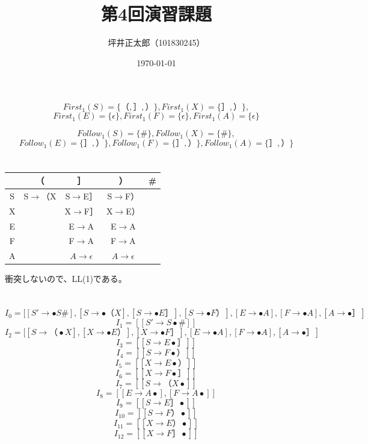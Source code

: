 \documentclass[a4paper,10pt]{jsarticle}
\begin{document}
\title{第4回演習課題}
\author{坪井正太郎（101830245）}
\date{\today}
\maketitle
\section{}
\[First_1(S)=\{（,］,）\},First_1(X)=\{］,）\},\]
\[First_1(E)=\{\epsilon\},First_1(F)=\{\epsilon\},First_1(A)=\{\epsilon\}\]

\[Follow_1(S)=\{\#\},Follow_1(X)=\{\#\},\]
\[Follow_1(E)=\{］,）\},Follow_1(F)=\{］,）\},Follow_1(A)=\{］,）\}\]

\section{}
\begin{table}[H]
  \centering
  \begin{tabular}{|c|c|c|c|c|}\hline
      & （                 & {］}                    & ）                      & \# \\\hline
    S & S$\rightarrow $（X & S$\rightarrow $E］      & S$\rightarrow $F）      &    \\\hline
    X &                    & X$\rightarrow $F］      & X$\rightarrow $E）      &    \\\hline
    E &                    & E$\rightarrow $A        & E$\rightarrow $A        &    \\\hline
    F &                    & F$\rightarrow $A        & F$\rightarrow $A        &    \\\hline
    A &                    & $A\rightarrow \epsilon$ & $A\rightarrow \epsilon$ &    \\\hline
  \end{tabular}
\end{table}
衝突しないので、LL(1)である。

\newpage
\section{}
\[I_0=[[S'\rightarrow \bullet S\#],[S\rightarrow \bullet （X],[S\rightarrow \bullet E］],[S\rightarrow \bullet F）],[E\rightarrow \bullet A],[F\rightarrow \bullet A],[A\rightarrow \bullet］]\]
\[I_1=[[S'\rightarrow S\bullet \#]]\]
\[I_2=[[S\rightarrow （\bullet X],[X\rightarrow \bullet E）],[X\rightarrow \bullet F］],[E\rightarrow \bullet A],[F\rightarrow \bullet A],[A\rightarrow \bullet］]\]
\[I_3=[[S\rightarrow E\bullet ］]]\]
\[I_4=[[S\rightarrow F\bullet ）]]\]
\[I_5=[[X\rightarrow E\bullet ）]]\]
\[I_6=[[X\rightarrow F\bullet ］]]\]
\[I_7=[[S\rightarrow （X\bullet ]]\]
\[I_8=[[E\rightarrow A\bullet ],[F\rightarrow A\bullet ]]\]
\[I_9=[[S\rightarrow E］\bullet ]]\]
\[I_{10}=[[S\rightarrow F）\bullet ]]\]
\[I_{11}=[[X\rightarrow E）\bullet ]]\]
\[I_{12}=[[X\rightarrow F］\bullet ]]\]
\end{document}
